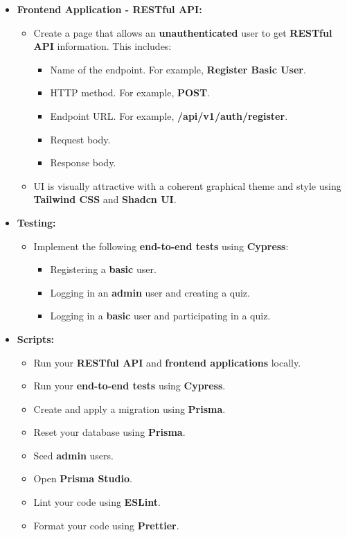 \documentclass{article}
\begin{document}
\begin{itemize}
	\item \textbf{Frontend Application - RESTful API:}
	\begin{itemize}
		\item Create a page that allows an \textbf{unauthenticated} user to get \textbf{RESTful API} information. This includes:
		\begin{itemize}
			\item Name of the endpoint. For example, \textbf{Register Basic User}.
			\item HTTP method. For example, \textbf{POST}.
			\item Endpoint URL. For example, \textbf{/api/v1/auth/register}.
			\item Request body.
			\item Response body.
		\end{itemize}
		\item UI is visually attractive with a coherent graphical theme and style using \textbf{Tailwind CSS} and \textbf{Shadcn UI}.
	\end{itemize}

	\item \textbf{Testing:}
	\begin{itemize}
		\item Implement the following \textbf{end-to-end tests} using \textbf{Cypress}:
		\begin{itemize}
			\item Registering a \textbf{basic} user.
			\item Logging in an \textbf{admin} user and creating a quiz.
			\item Logging in a \textbf{basic} user and participating in a quiz.
		\end{itemize}
	\end{itemize}

	\item \textbf{Scripts:}
	\begin{itemize}
		\item Run your \textbf{RESTful API} and \textbf{frontend applications} locally.
		\item Run your \textbf{end-to-end tests} using \textbf{Cypress}.
		\item Create and apply a migration using \textbf{Prisma}.
		\item Reset your database using \textbf{Prisma}.
		\item Seed \textbf{admin} users.
		\item Open \textbf{Prisma Studio}. 
		\item Lint your code using \textbf{ESLint}.
		\item Format your code using \textbf{Prettier}.
	\end{itemize}
\end{itemize}
\end{document}
